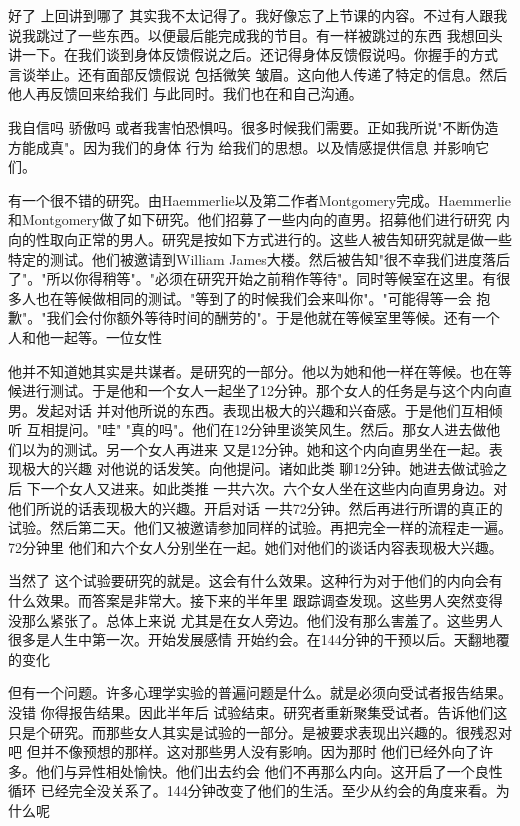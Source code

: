 好了 上回讲到哪了 其实我不太记得了。我好像忘了上节课的内容。不过有人跟我说我跳过了一些东西。以便最后能完成我的节目。有一样被跳过的东西 我想回头讲一下。在我们谈到身体反馈假说之后。还记得身体反馈假说吗。你握手的方式 言谈举止。还有面部反馈假说 包括微笑 皱眉。这向他人传递了特定的信息。然后他人再反馈回来给我们 与此同时。我们也在和自己沟通。 

我自信吗 骄傲吗 或者我害怕恐惧吗。很多时候我们需要。正如我所说"不断伪造方能成真"。因为我们的身体 行为 给我们的思想。以及情感提供信息 并影响它们。 

有一个很不错的研究。由Haemmerlie以及第二作者Montgomery完成。Haemmerlie和Montgomery做了如下研究。他们招募了一些内向的直男。招募他们进行研究 内向的性取向正常的男人。研究是按如下方式进行的。这些人被告知研究就是做一些特定的测试。他们被邀请到William James大楼。然后被告知"很不幸我们进度落后了"。"所以你得稍等"。"必须在研究开始之前稍作等待"。同时等候室在这里。有很多人也在等候做相同的测试。"等到了的时候我们会来叫你"。"可能得等一会 抱歉"。"我们会付你额外等待时间的酬劳的"。于是他就在等候室里等候。还有一个人和他一起等。一位女性 

他并不知道她其实是共谋者。是研究的一部分。他以为她和他一样在等候。也在等候进行测试。于是他和一个女人一起坐了12分钟。那个女人的任务是与这个内向直男。发起对话 并对他所说的东西。表现出极大的兴趣和兴奋感。于是他们互相倾听 互相提问。"哇" "真的吗"。他们在12分钟里谈笑风生。然后。那女人进去做他们以为的测试。另一个女人再进来 又是12分钟。她和这个内向直男坐在一起。表现极大的兴趣 对他说的话发笑。向他提问。诸如此类 聊12分钟。她进去做试验之后 下一个女人又进来。如此类推 一共六次。六个女人坐在这些内向直男身边。对他们所说的话表现极大的兴趣。开启对话 一共72分钟。然后再进行所谓的真正的试验。然后第二天。他们又被邀请参加同样的试验。再把完全一样的流程走一遍。72分钟里 他们和六个女人分别坐在一起。她们对他们的谈话内容表现极大兴趣。 

当然了 这个试验要研究的就是。这会有什么效果。这种行为对于他们的内向会有什么效果。而答案是非常大。接下来的半年里 跟踪调查发现。这些男人突然变得没那么紧张了。总体上来说 尤其是在女人旁边。他们没有那么害羞了。这些男人 很多是人生中第一次。开始发展感情 开始约会。在144分钟的干预以后。天翻地覆的变化 

但有一个问题。许多心理学实验的普遍问题是什么。就是必须向受试者报告结果。没错 你得报告结果。因此半年后 试验结束。研究者重新聚集受试者。告诉他们这只是个研究。而那些女人其实是试验的一部分。是被要求表现出兴趣的。很残忍对吧 但并不像预想的那样。这对那些男人没有影响。因为那时 他们已经外向了许多。他们与异性相处愉快。他们出去约会 他们不再那么内向。这开启了一个良性循环 已经完全没关系了。144分钟改变了他们的生活。至少从约会的角度来看。为什么呢 

